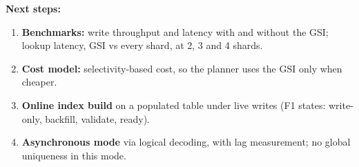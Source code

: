 \documentclass[11pt,a4paper]{article}
\begin{document}
\textbf{Next steps:}
\begin{enumerate}
  \item \textbf{Benchmarks:} write throughput and latency with and without the GSI; lookup latency,
        GSI vs every shard, at 2, 3 and 4 shards.
  \item \textbf{Cost model:} selectivity-based cost, so the planner uses the GSI only when cheaper.
  \item \textbf{Online index build} on a populated table under live writes (F1 states: write-only,
        backfill, validate, ready).
  \item \textbf{Asynchronous mode} via logical decoding, with lag measurement; no global uniqueness
        in this mode.
\end{enumerate}
\end{document}
